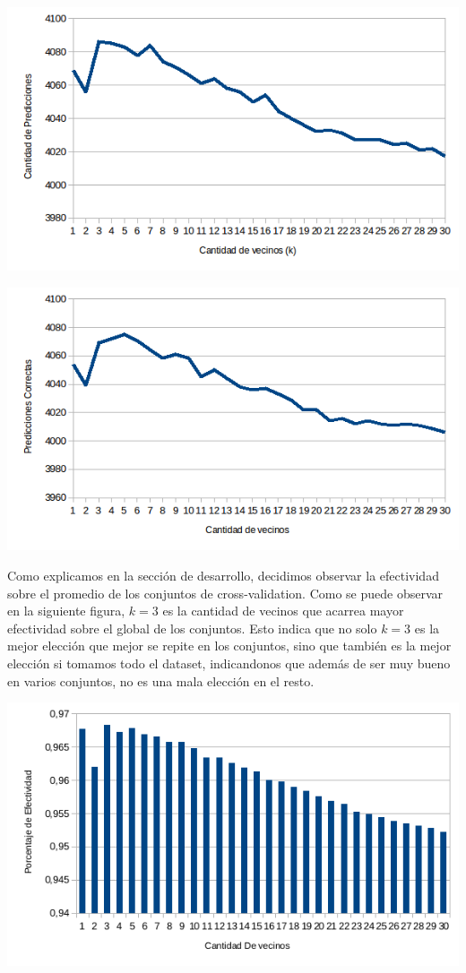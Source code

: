 \begin{center}
\includegraphics[scale=0.55]{nuevosResultados/knn/3.png}
\end{center}
\begin{center}
\includegraphics[scale=0.55]{nuevosResultados/knn/4.png}
\end{center}
Como explicamos en la sección de desarrollo, decidimos observar la efectividad sobre el promedio de los conjuntos de cross-validation. Como se puede observar en la siguiente figura, $k=3$ es la cantidad de vecinos que acarrea mayor efectividad sobre el global de los conjuntos. Esto indica que no solo $k=3$ es la mejor elección que mejor se repite en los conjuntos, sino que también es la mejor elección si tomamos todo el dataset, indicandonos que además de ser muy bueno en varios conjuntos, no es una mala elección en el resto.
\begin{center}
\includegraphics[scale=0.6]{nuevosResultados/testeokPCA.png}\\
\end{center}

